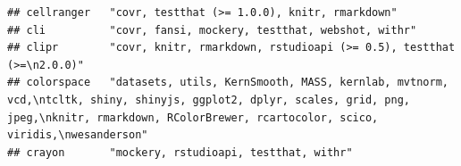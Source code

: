 \documentclass[]{article}
\begin{document}
\begin{verbatim}
## cellranger   "covr, testthat (>= 1.0.0), knitr, rmarkdown"                                                                                                                                                                                                                                                                                                                                                                                                                                                                                                                                             
## cli          "covr, fansi, mockery, testthat, webshot, withr"                                                                                                                                                                                                                                                                                                                                                                                                                                                                                                                                          
## clipr        "covr, knitr, rmarkdown, rstudioapi (>= 0.5), testthat (>=\n2.0.0)"                                                                                                                                                                                                                                                                                                                                                                                                                                                                                                                       
## colorspace   "datasets, utils, KernSmooth, MASS, kernlab, mvtnorm, vcd,\ntcltk, shiny, shinyjs, ggplot2, dplyr, scales, grid, png, jpeg,\nknitr, rmarkdown, RColorBrewer, rcartocolor, scico, viridis,\nwesanderson"                                                                                                                                                                                                                                                                                                                                                                                   
## crayon       "mockery, rstudioapi, testthat, withr"                                                                                                                                                                                                                                                                                                                                                                                                                                                                                                                                                    

\end{verbatim}
\end{document}

